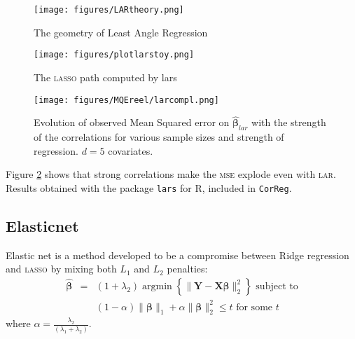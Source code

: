 \documentclass[12pt,a4paper]{report}
\begin{document}
\begin{figure}[h!]
	\centering
		  \texttt{[image: figures/LARtheory.png]}
		\caption{The geometry of Least Angle Regression}
	\end{figure}
				
\begin{figure}[h!]
	\centering
		  \texttt{[image: figures/plotlarstoy.png]}
		\caption{The \textsc{lasso} path computed by lars}\label{plotlarstoy}
	\end{figure}			
	
		 \begin{figure}
	 \centering
	  \texttt{[image: figures/MQEreel/larcompl.png]}
	  \caption{Evolution of observed Mean Squared error on $\hat{\boldsymbol{\beta}}_{lar}$ with the strength of the correlations for various sample sizes and strength of regression. $d=5$ covariates. } \label{MQElarcompl}
	\end{figure}	
	 Figure \ref{MQElarcompl} shows that strong correlations make the \textsc{mse} explode even with \textsc{lar}. Results obtained with the package {\tt lars} for R, included in {\tt CorReg}.
 	 
	 \FloatBarrier
		\subsection{Elasticnet}		%

			Elastic net \cite{zou2005regularization} is a method developed to be a compromise between Ridge regression and \textsc{lasso} by mixing both $L_1$ and $L_2$ penalties: 
	\begin{eqnarray}
		\boldsymbol{\hat{\beta}}&=&(1+\lambda_2) \operatorname{argmin}\left\lbrace \parallel \boldsymbol{Y}-\boldsymbol{X\beta} \parallel_2^2 \right\rbrace \textrm{ subject to} \nonumber \\
			 & &(1-\alpha)\parallel\boldsymbol{\beta}\parallel_1+\alpha\parallel\boldsymbol{\beta}\parallel_2^2\leq t \textrm{ for some } t  \nonumber 
	\end{eqnarray}
	where $\alpha=\frac{\lambda_2}{(\lambda_1+\lambda_2)}$. 
	
\end{document}
